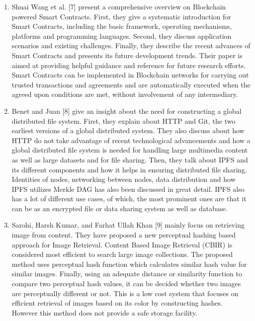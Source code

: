 \documentclass[10pt]{article}
\begin{document}
\begin{enumerate}
\\
\item Shuai Wang et al. [7] present a comprehensive overview on Blockchain powered Smart Contracts. First, they give a systematic introduction for Smart Contracts, including the basic framework, operating mechanisms, platforms and programming languages. Second, they discuss application scenarios and existing challenges. Finally, they describe the recent advances of Smart Contracts and presents its future development trends. Their paper is aimed at providing helpful guidance and reference for future research efforts. Smart Contracts can be implemented in Blockchain networks for carrying out trusted transactions and agreements and are automatically executed when the agreed upon conditions are met, without involvement of any intermediary.
\\
\item  Benet and Juan [8] give an insight about the need for constructing a global distributed file system. First, they explain about HTTP and Git, the two earliest versions of a global distributed system. They also discuss about how HTTP do not take advantage of recent technological advancements and how a global distributed file system is needed for handling large multimedia content as well as large datasets and for file sharing. Then, they talk about IPFS and its different components and how it helps in ensuring distributed file sharing. Identities of nodes, networking between nodes, data distribution and how IPFS utilizes Merkle DAG has also been discussed in great detail. IPFS also has a lot of different use cases, of which, the most prominent ones are that it can be as an encrypted file or data sharing system as well as database.
\\
\item  Sarohi, Harsh Kumar, and Farhat Ullah Khan [9]
mainly focus on retrieving image from content. They have proposed a new perceptual hashing based approach for Image Retrieval. Content Based Image Retrieval (CBIR) is considered most efficient to search large image collections. The proposed method uses perceptual hash function which calculates similar hash value for similar images. Finally, using an adequate distance or similarity function to compare two perceptual hash values, it can be decided whether two images are perceptually different or not. This is a low cost system that focuses on efficient retrieval of images based on its color by constructing hashes. However this method does not provide a safe storage facility.
\\

\end{enumerate}
\end{document}
